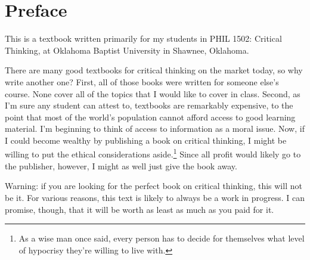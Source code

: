
\chapter{Preface}
\label{chap:preface}

This is a textbook written primarily for my students in PHIL 1502: Critical Thinking, at Oklahoma Baptist University in Shawnee, Oklahoma.

There are many good textbooks for critical thinking on the market today, so why write another one? First, all of those books were written for someone else's course. None cover all of the topics that I would like to cover in class. Second, as I'm sure any student can attest to, textbooks are remarkably expensive, to the point that most of the world's population cannot afford access to good learning material. I'm beginning to think of access to information as a moral issue.  Now, if I could become wealthy by publishing a book on critical thinking, I might be willing to put the ethical considerations aside.\footnote{As a wise man once said, every person has to decide for themselves what level of hypocrisy they're willing to live with.} Since all profit would likely go to the publisher, however, I might as well just give the book away.

Warning: if you are looking for the perfect book on critical thinking, this will not be it. For various reasons, this text is likely to always be a work in progress. I can promise, though, that it will be worth as least as much as you paid for it.


